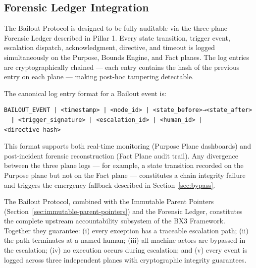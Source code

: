 \subsection{Forensic Ledger Integration}

The Bailout Protocol is designed to be fully auditable via the three-plane Forensic Ledger described in Pillar 1. Every state transition, trigger event, escalation dispatch, acknowledgment, directive, and timeout is logged simultaneously on the Purpose, Bounds Engine, and Fact planes. The log entries are cryptographically chained — each entry contains the hash of the previous entry on each plane — making post-hoc tampering detectable.

The canonical log entry format for a Bailout event is:

\begin{verbatim}
BAILOUT_EVENT | <timestamp> | <node_id> | <state_before>→<state_after>
  | <trigger_signature> | <escalation_id> | <human_id> | <directive_hash>
\end{verbatim}

This format supports both real-time monitoring (Purpose Plane dashboards) and post-incident forensic reconstruction (Fact Plane audit trail). Any divergence between the three plane logs — for example, a state transition recorded on the Purpose plane but not on the Fact plane — constitutes a chain integrity failure and triggers the emergency fallback described in Section~\ref{sec:bypass}.

The Bailout Protocol, combined with the Immutable Parent Pointers (Section~\ref{sec:immutable-parent-pointers}) and the Forensic Ledger, constitutes the complete upstream accountability subsystem of the BX3 Framework. Together they guarantee: (i) every exception has a traceable escalation path; (ii) the path terminates at a named human; (iii) all machine actors are bypassed in the escalation; (iv) no execution occurs during escalation; and (v) every event is logged across three independent planes with cryptographic integrity guarantees.